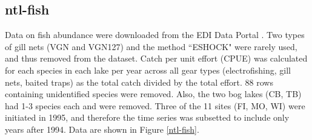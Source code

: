 \documentclass[11pt, oneside]{article}
\begin{document}


\subsection {ntl-fish}

Data on fish abundance were downloaded from the EDI Data Portal \citep{ntl-fish}.
Two types of gill nets (VGN and VGN127) and the method  ``ESHOCK" were rarely used, and thus removed from the dataset.%
Catch per unit effort (CPUE) was calculated for each species in each lake per year across all gear types (electrofishing, gill nets, baited traps) as the total catch divided by the total effort.
88 rows containing unidentified species were removed.
Also, the two bog lakes (CB, TB) had 1-3 species each and were removed. 
Three of the 11 sites (FI, MO, WI) were initiated in 1995, and therefore the time series was subsetted to include only years after 1994.
Data are shown in Figure \ref{ntl-fish}.
\end{document}
